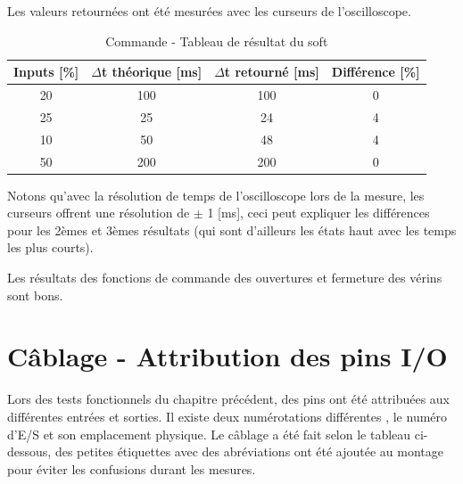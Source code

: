 Les valeurs retournées ont été mesurées avec les curseurs de l'oscilloscope.
\begin{table}[h]
    \begin{center}
        \caption{Commande - Tableau de résultat du soft}
        \begin{tabular}{|c|c|c|c|}
            Inputs [\%] & $\Delta$t théorique [ms] & $\Delta$t retourné [ms] & Différence  [\%] \\ \hline
            20          & 100                      & 100                     & 0                \\
            25          & 25                       & 24                      & 4                \\
            10          & 50                       & 48                      & 4                \\
            50          & 200                      & 200                     & 0                \\
        \end{tabular}
    \end{center}
    Notons qu'avec la résolution de temps de l'oscilloscope lors de la mesure, les curseurs offrent une résolution de $\pm$ 1 [ms],
    ceci peut expliquer les différences pour les 2èmes et 3èmes résultats (qui sont d'ailleurs les états haut avec les temps les plus courts).
\end{table}

Les résultats des fonctions de commande des ouvertures et fermeture des vérins sont bons.
\newpage
\section{Câblage - Attribution des pins I/O}
Lors des tests fonctionnels du chapitre précédent, des pins ont été attribuées aux différentes entrées et sorties. Il existe deux numérotations différentes \cite{pinning_Rpi4},
le numéro d'E/S et son emplacement physique. Le câblage a été fait selon le tableau ci-dessous, des petites étiquettes avec des abréviations ont été ajoutée au montage pour éviter les confusions durant les mesures.


